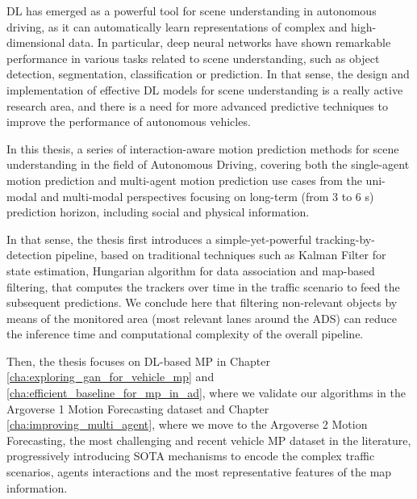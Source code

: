 \ac{DL} has emerged as a powerful tool for scene understanding in autonomous driving, as it can automatically learn representations of complex and high-dimensional data. In particular, deep neural networks have shown remarkable performance in various tasks related to scene understanding, such as object detection, segmentation, classification or prediction. In that sense, the design and implementation of effective \ac{DL} models for scene understanding is a really active research area, and there is a need for more advanced predictive techniques to improve the performance of autonomous vehicles.

In this thesis, a series of interaction-aware motion prediction methods for scene understanding in the field of Autonomous Driving, covering both the single-agent motion prediction and multi-agent motion prediction use cases from the uni-modal and multi-modal perspectives focusing on long-term (from 3 to 6 s) prediction horizon, including social and physical information.


In that sense, the thesis first introduces a simple-yet-powerful tracking-by-detection pipeline, based on traditional techniques such as Kalman Filter for state estimation, Hungarian algorithm for data association and map-based filtering, that computes the trackers over time in the traffic scenario to feed the subsequent predictions. We conclude here that filtering non-relevant objects by means of the monitored area (most relevant lanes around the \ac{ADS}) can reduce the inference time and computational complexity of the overall pipeline.

Then, the thesis focuses on \ac{DL}-based \ac{MP} in Chapter \ref{cha:exploring_gan_for_vehicle_mp} and \ref{cha:efficient_baseline_for_mp_in_ad}, where we validate our algorithms in the Argoverse 1 Motion Forecasting dataset and Chapter \ref{cha:improving_multi_agent}, where we move to the Argoverse 2 Motion Forecasting, the most challenging and recent vehicle \ac{MP} dataset in the literature, progressively introducing \ac{SOTA} mechanisms to encode the complex traffic scenarios, agents interactions and the most representative features of the map information. 

